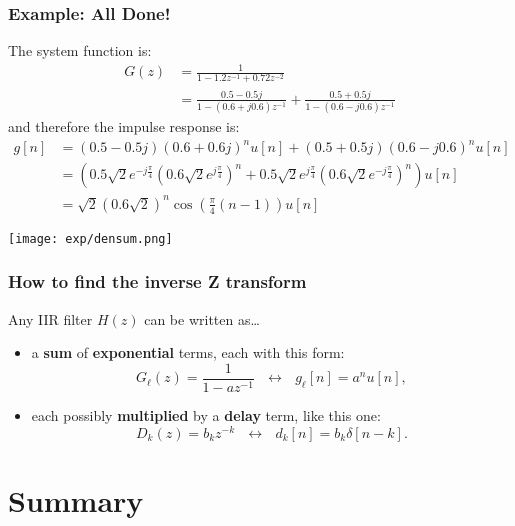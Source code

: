\documentclass{beamer}
\begin{document}
\begin{frame}
  \frametitle{Example: All Done!}
  The system function is:
  \begin{align*}
    G(z) &= \frac{1}{1-1.2z^{-1}+0.72z^{-2}}\\
    &=\frac{0.5-0.5j}{1-(0.6+j0.6)z^{-1}}+\frac{0.5+0.5j}{1-(0.6-j0.6)z^{-1}}
  \end{align*}
  and therefore the impulse response is:
  \begin{align*}
    g[n] &= (0.5-0.5j)(0.6+0.6j)^nu[n]+(0.5+0.5j)(0.6-j0.6)^nu[n]\\
    &= \left(0.5\sqrt{2}e^{-j\frac{\pi}{4}}\left(0.6\sqrt{2}e^{j\frac{\pi}{4}}\right)^n+
    0.5\sqrt{2}e^{j\frac{\pi}{4}}\left(0.6\sqrt{2}e^{-j\frac{\pi}{4}}\right)^n\right)u[n]\\
    &= \sqrt{2}(0.6\sqrt{2})^n \cos\left(\frac{\pi}{4}(n-1)\right)u[n]
  \end{align*}
\end{frame}

\begin{frame}
  \centerline{\texttt{[image: exp/densum.png]}}
\end{frame}

\begin{frame}
  \frametitle{How to find the inverse Z transform}

  Any IIR filter $H(z)$ can be written as\ldots
  \begin{itemize}
  \item a {\bf sum} of {\bf exponential} terms, each with this form:
    \begin{displaymath}
      G_\ell(z)=\frac{1}{1-az^{-1}}~~~\leftrightarrow~~~g_\ell[n]= a^nu[n],
    \end{displaymath}
  \item each possibly {\bf multiplied} by a {\bf delay} term, like this one:
    \begin{displaymath}
      D_k(z)=b_kz^{-k}~~~\leftrightarrow~~~d_k[n]=b_k\delta[n-k].
    \end{displaymath}
  \end{itemize}
\end{frame}

\section[Summary]{Summary}
\setcounter{subsection}{1}
\end{document}

